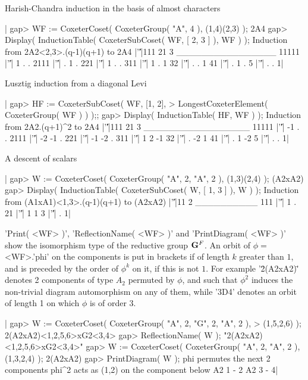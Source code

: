 Harish-Chandra induction in the basis of almost characters\:

|    gap> WF := CoxeterCoset( CoxeterGroup( "A", 4 ), (1,4)(2,3) );
    2A4
    gap> Display( InductionTable( CoxeterSubCoset( WF, [ 2, 3 ] ), WF ) );
    Induction from 2A2<2,3>.(q-1)(q+1) to 2A4
          |'\|'|111 21 3
    ________________
    11111 |'\|'|  1  . .
    2111  |'\|'|  .  1 .
    221   |'\|'|  1  . .
    311   |'\|'|  1  . 1
    32    |'\|'|  .  . 1
    41    |'\|'|  .  1 .
    5     |'\|'|  .  . 1|

Lusztig induction from a diagonal Levi\:

|    gap> HF := CoxeterSubCoset( WF, [1, 2],
    >                LongestCoxeterElement( CoxeterGroup( WF ) ) );;
    gap> Display( InductionTable( HF, WF ) );
    Induction from 2A2.(q+1)^2 to 2A4
          |'\|'|111 21  3
    _________________
    11111 |'\|'| -1  .  .
    2111  |'\|'| -2 -1  .
    221   |'\|'| -1 -2  .
    311   |'\|'|  1  2 -1
    32    |'\|'|  . -2  1
    41    |'\|'|  .  1 -2
    5     |'\|'|  .  .  1|

A descent of scalars\:

|    gap> W := CoxeterCoset( CoxeterGroup( "A", 2, "A", 2 ), (1,3)(2,4) );
    (A2xA2)
    gap> Display( InductionTable( CoxeterSubCoset( W, [ 1, 3 ] ), W ) );
    Induction from (A1xA1)<1,3>.(q-1)(q+1) to (A2xA2)
        |'\|'|11 2
    __________
    111 |'\|'| 1 .
    21  |'\|'| 1 1
    3   |'\|'| . 1|

'Print(  <WF> )', 'ReflectionName( <WF> )'  and 'PrintDiagram( <WF> )' show
the   isomorphism  type  of  the  reductive  group  ${\bf G}^F$.  An  orbit  of
$\phi=$<WF>.'phi'  on the  components is  put in  brackets if of length $k$
greater  than $1$, and is preceded by the  order of $\phi^k$ on it, if this
is  not $1$. For example '\"2(A2xA2)\"'  denotes 2 components of type $A_2$
permuted  by $\phi$, and such that $\phi^2$ induces the non-trivial diagram
automorphism  on any of them,  while '3D4' denotes an  orbit of length 1 on
which $\phi$ is of order 3.

|    gap> W := CoxeterCoset( CoxeterGroup( "A", 2, "G", 2, "A", 2 ),
    >                                                       (1,5,2,6) );
    2(A2xA2)<1,2,5,6>xG2<3,4>
    gap> ReflectionName( W );
    "2(A2xA2)<1,2,5,6>xG2<3,4>"
    gap> W := CoxeterCoset( CoxeterGroup( "A", 2, "A", 2 ), (1,3,2,4) );
    2(A2xA2)
    gap> PrintDiagram( W );
    phi permutes the next 2 components
    phi^2 acts as (1,2) on the component below
    A2 1 - 2
    A2 3 - 4|

